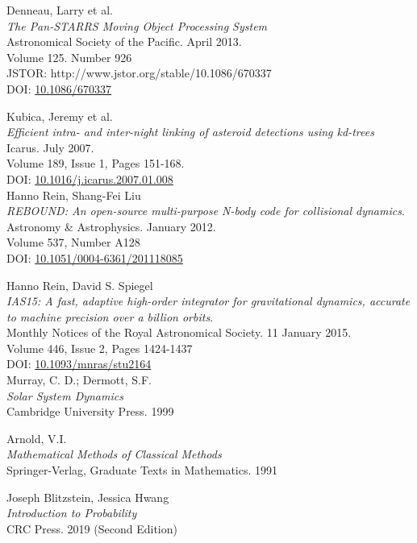 \newpage
\begin{thebibliography}{9}

Denneau, Larry et al.\\
\textit{The Pan-STARRS Moving Object Processing System}\\
Astronomical Society of the Pacific.  April 2013.\\
Volume 125. Number 926\\
JSTOR: http://www.jstor.org/stable/10.1086/670337 \\
DOI: \href{https://doi.org/10.1086/670337}{10.1086/670337}

Kubica, Jeremy et al.\\
\textit{Efficient intra- and inter-night linking of asteroid detections using kd-trees}\\
Icarus. July 2007.\\
Volume 189, Issue 1, Pages 151-168.\\
DOI: 	\href{https://doi.org/10.1016/j.icarus.2007.01.008}{10.1016/j.icarus.2007.01.008}\\

Hanno Rein, Shang-Fei Liu\\
\textit{REBOUND: An open-source multi-purpose N-body code for collisional dynamics}.\\
Astronomy \& Astrophysics.  January 2012.\\
Volume 537, Number A128\\
DOI: \href{https://doi.org/10.1051/0004-6361/201118085}{10.1051/0004-6361/201118085}

Hanno Rein, David S. Spiegel\\
\textit{IAS15: A fast, adaptive high-order integrator for gravitational dynamics, accurate to machine precision over a billion orbits}.\\
Monthly Notices of the Royal Astronomical Society.  11 January 2015.\\
Volume 446, Issue 2, Pages 1424-1437\\
DOI: \href{https://doi.org/10.1093/mnras/stu2164}{10.1093/mnras/stu2164}\\

Murray, C. D.; Dermott, S.F. \\
\textit{Solar System Dynamics}\\
Cambridge University Press. 1999

Arnold, V.I.\\
\textit{Mathematical Methods of Classical Methods}\\
Springer-Verlag, Graduate Texts in Mathematics.  1991

Joseph Blitzstein, Jessica Hwang\\
\textit{Introduction to Probability}\\
CRC Press.  2019 (Second Edition)

\end{thebibliography}